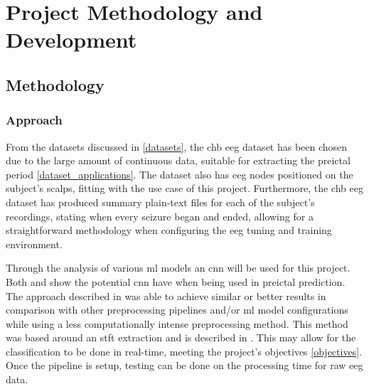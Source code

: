 \documentclass[12pt]{article}
\begin{document}
\section{Project Methodology and Development}\label{development}

\subsection{Methodology}

\subsubsection{Approach}

From the datasets discussed in \ref{datasets}, the \acrfull{chb} \acrshort{eeg} dataset has been chosen due to the large amount of continuous data, suitable for extracting the preictal period \ref{dataset_applications}. The dataset also has \acrshort{eeg} nodes positioned on the subject's scalps, fitting with the use case of this project. Furthermore, the \acrshort{chb} \acrshort{eeg} dataset has produced summary plain-text files for each of the subject's recordings, stating when every seizure began and ended, allowing for a straightforward methodology when configuring the \acrshort{eeg} tuning and training environment.

Through the analysis of various \acrshort{ml} models an \acrshort{cnn} will be used for this project. Both \cite{truong2018convolutional} and \cite{mirowski2009classification} show the potential \acrshort{cnn} have when being used in preictal prediction. The approach described in \cite{truong2018convolutional} was able to achieve similar or better results in comparison with other preprocessing pipelines and/or \acrshort{ml} model configurations while using a less computationally intense preprocessing method. This method was based around an \acrshort{stft} extraction and is described in \cite{truong2018convolutional}. This may allow for the classification to be done in real-time, meeting the project's objectives \ref{objectives}. Once the pipeline is setup, testing can be done on the processing time for raw \acrshort{eeg} data.
\end{document}
